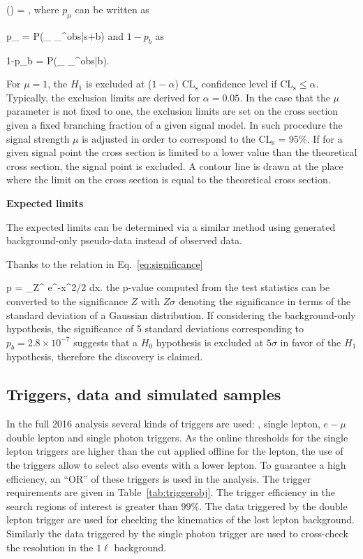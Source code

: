{
(\mu) = ,
}
where $p_{\mu}$ can be written as

{
p_{\mu} = P(_{\mu} \geq {}_{\mu}^{obs}|s+b)
}
and $1-p_{b}$ as

{
1-p_{b} = P(_{\mu} \geq {}_{\mu}^{obs}|b).
}

For $\mu=1$, the $H_{1}$ is excluded at ($1-\alpha$) $\mathrm{CL_{s}}$ confidence level if $\mathrm{CL_{s}} \leq \alpha$. Typically, the exclusion limits are derived for $\alpha = 0.05$. In the case that the $\mu$ parameter is not fixed to one, the exclusion limits are set on the cross section given a fixed branching fraction of a given signal model. In such procedure the signal strength $\mu$ is adjusted in order to correspond to the $\mathrm{CL_{s}}$ = 95\%. If for a given signal point the cross section is limited to a lower value than the theoretical cross section, the signal point is excluded. A contour line is drawn at the place where the limit on the cross section is equal to the theoretical cross section.

\textbf{Expected limits}

The expected limits can be determined via a similar method using generated background-only pseudo-data instead of observed data. 

Thanks to the relation in Eq.~\ref{eq:significance} 

{
 p = \int_Z^{\infty}  e^{-x^{2}/2} dx.
}
the p-value computed from the test statistics can be converted to the significance $Z$ with $Z\sigma$ denoting the significance in terms of the standard deviation of a Gaussian distribution. If considering the background-only hypothesis, the significance of 5 standard deviations corresponding to $p_{b} = 2.8 \times 10^{-7} $ suggests that a $H_{0}$ hypothesis is excluded at $5 \sigma$ in favor of the $H_{1}$ hypothesis, therefore the discovery is claimed. %


\subsection{Triggers, data and simulated samples~\label{sec:trigger}}

In the full 2016 analysis several kinds of triggers are used:  \MET, single lepton, $e-\mu$ double lepton  and single photon triggers. As the online thresholds for the single lepton triggers are higher than the cut applied offline for the lepton, the use of the \MET triggers allow to select also events with a lower \pt lepton. To guarantee a high efficiency,  an ``OR'' of these triggers is used in the analysis. The trigger requirements are given in Table~\ref{tab:triggerobj}. The trigger efficiency in the search regions of interest is greater than 99\%. The data triggered by the double lepton trigger are used for checking the kinematics of the lost lepton background. Similarly the data triggered by the single photon trigger are used to cross-check the \MET resolution in  the $1\ell$ background. 

